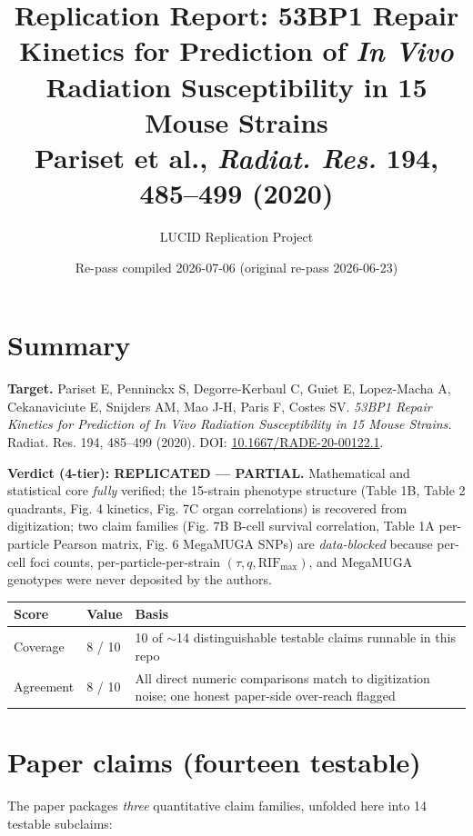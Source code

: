\documentclass[11pt]{article}
\title{Replication Report: 53BP1 Repair Kinetics for Prediction of \textit{In Vivo}
Radiation Susceptibility in 15 Mouse Strains \\
\large Pariset et al., \textit{Radiat. Res.} 194, 485--499 (2020)}
\author{LUCID Replication Project}
\date{Re-pass compiled 2026-07-06 (original re-pass 2026-06-23)}
\begin{document}
\maketitle

\section*{Summary}

\textbf{Target.} Pariset E, Penninckx S, Degorre-Kerbaul C, Guiet E, Lopez-Macha A,
Cekanaviciute E, Snijders AM, Mao J-H, Paris F, Costes SV. \emph{53BP1 Repair Kinetics
for Prediction of In Vivo Radiation Susceptibility in 15 Mouse Strains.} Radiat. Res.
194, 485--499 (2020). DOI: \href{https://doi.org/10.1667/RADE-20-00122.1}{10.1667/RADE-20-00122.1}.

\textbf{Verdict (4-tier): REPLICATED --- PARTIAL.}
Mathematical and statistical core \emph{fully} verified; the 15-strain phenotype
structure (Table 1B, Table 2 quadrants, Fig. 4 kinetics, Fig. 7C organ correlations)
is recovered from digitization; two claim families (Fig. 7B B-cell survival correlation,
Table 1A per-particle Pearson matrix, Fig. 6 MegaMUGA SNPs) are \emph{data-blocked}
because per-cell foci counts, per-particle-per-strain $(\tau,q,\text{RIF}_{\max})$, and
MegaMUGA genotypes were never deposited by the authors.

\begin{center}
\begin{tabular}{@{}lll@{}}
\toprule
Score & Value & Basis \\
\midrule
Coverage  & 8 / 10 & 10 of $\sim$14 distinguishable testable claims runnable in this repo \\
Agreement & 8 / 10 & All direct numeric comparisons match to digitization noise; one honest paper-side over-reach flagged \\
\bottomrule
\end{tabular}
\end{center}

\section{Paper claims (fourteen testable)}

The paper packages \emph{three} quantitative claim families, unfolded here into 14 testable
subclaims:
\end{document}
